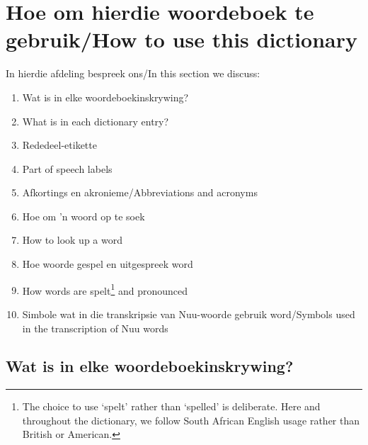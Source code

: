 \newpage


\markboth{}{}
\section{Hoe om hierdie woordeboek te gebruik/How to use this
dictionary}
\markboth{}{}

In hierdie afdeling bespreek ons/In this section we discuss:
\begin{enumerate}
    \setlength{\itemsep}{-.3em}
    \item[\ref{s:watisin_a}] Wat is in elke woordeboekinskrywing?
    \item[\ref{s:watisin_e}] What is in each dictionary entry?
    \item[\ref{s:pos_a}] Rededeel-etikette
    \item[\ref{s:pos_e}] Part of speech labels
    \item[\ref{s:afk}] Afkortings en akronieme/Abbreviations and acronyms
    \item[\ref{s:lookup_a}] Hoe om 'n woord op te soek
    \item[\ref{s:lookup_e}] How to look up a word
    \item[\ref{s:spelling_a}] Hoe woorde gespel en uitgespreek word
    \item[\ref{s:spelling_e}] How words are spelt\footnote{The choice to
        use `spelt' rather than `spelled' is deliberate. Here and
        throughout the dictionary, we follow South African English
        usage rather than British or American.} and pronounced
    \item [\ref{s:symbols}] Simbole wat in die transkripsie van
        N\textipa{\textvertline}uu-woorde gebruik word/Symbols used in
        the transcription of N\textipa{\textvertline}uu words
\end{enumerate}


\markboth{}{}
\subsection{Wat is in elke woordeboekinskrywing?}
\label{s:watisin_a}
\markboth{}{}

